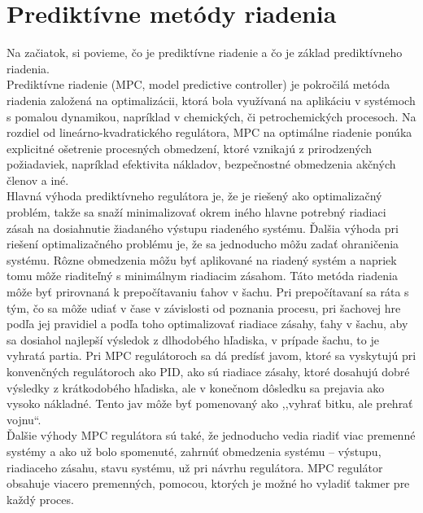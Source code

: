 \section{Prediktívne metódy riadenia}
Na začiatok, si povieme, čo je prediktívne riadenie a čo je základ prediktívneho riadenia.\\
\indent Prediktívne riadenie (MPC, model predictive controller) je pokročilá metóda riadenia založená na optimalizácii, ktorá bola využívaná na aplikáciu v systémoch s pomalou dynamikou, napríklad v chemických, či petrochemických procesoch. Na rozdiel od lineárno-kvadratického regulátora, MPC na optimálne riadenie ponúka explicitné ošetrenie procesných obmedzení, ktoré vznikajú z prirodzených požiadaviek, napríklad efektivita nákladov, bezpečnostné obmedzenia akčných členov a iné.\cite{MPC01} \\
\indent Hlavná výhoda prediktívneho regulátora je, že je riešený ako optimalizačný problém, takže sa snaží minimalizovať okrem iného hlavne potrebný riadiaci zásah na dosiahnutie žiadaného výstupu riadeného systému. Ďalšia výhoda pri riešení optimalizačného problému je, že sa jednoducho môžu zadať ohraničenia systému. Rôzne obmedzenia môžu byť aplikované na riadený systém a napriek tomu môže riaditeľný s minimálnym riadiacim zásahom. Táto metóda riadenia môže byť prirovnaná k prepočítavaniu ťahov v šachu. Pri prepočítavaní sa ráta s tým, čo sa môže udiať v čase v závislosti od poznania procesu, pri šachovej hre podľa jej pravidiel a podľa toho optimalizovať riadiace zásahy, ťahy v šachu, aby sa dosiahol najlepší výsledok z dlhodobého hľadiska, v prípade šachu, to je vyhratá partia. Pri MPC regulátoroch sa dá predísť javom, ktoré sa vyskytujú pri konvenčných regulátoroch ako PID, ako sú riadiace zásahy, ktoré dosahujú dobré výsledky z krátkodobého hľadiska, ale v konečnom dôsledku sa prejavia ako vysoko nákladné. Tento jav môže byť pomenovaný ako ,,vyhrať bitku, ale prehrať vojnu``. \\ 
\indent Ďalšie výhody MPC regulátora sú také, že jednoducho vedia riadiť viac premenné systémy a ako už bolo spomenuté, zahrnúť obmedzenia systému – výstupu, riadiaceho zásahu, stavu systému, už pri návrhu regulátora. MPC regulátor obsahuje viacero premenných, pomocou, ktorých je možné ho vyladiť takmer pre každý proces. \\
